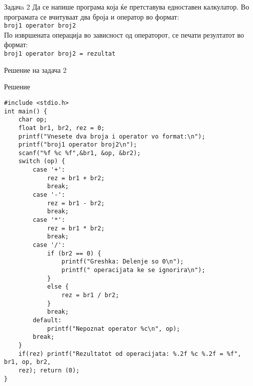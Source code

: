 \begin{frame}{Задачa 2}
Да се напише програма која ќе претставува едноставен калкулатор. Во програмата
се вчитуваат два броја и оператор во формат:\\
\texttt{broj1 operator broj2}\\
По извршената операција во зависност од операторот, се печати резултатот во
формат:\\
\texttt{broj1 operator broj2 = rezultat}
\end{frame}

\begin{frame}[fragile,shrink=10]{Решение на задача 2}
\begin{exampleblock}{Решение}
\begin{lstlisting}
#include <stdio.h>
int main() {
    char op;
    float br1, br2, rez = 0;
    printf("Vnesete dva broja i operator vo format:\n");
    printf("broj1 operator broj2\n");
    scanf("%f %c %f",&br1, &op, &br2);
    switch (op) {
        case '+':
            rez = br1 + br2;
            break;
        case '-':
            rez = br1 - br2;
            break;
        case '*':
            rez = br1 * br2;
            break;
        case '/':
            if (br2 == 0) {
                printf("Greshka: Delenje so 0\n");
                printf(" operacijata ke se ignorira\n");
            }
            else {
                rez = br1 / br2;
            }
            break;
        default:
            printf("Nepoznat operator %c\n", op);
        break;
    }
    if(rez) printf("Rezultatot od operacijata: %.2f %c %.2f = %f", br1, op, br2,
    rez); return (0);
}
\end{lstlisting}
\end{exampleblock}
\end{frame}

